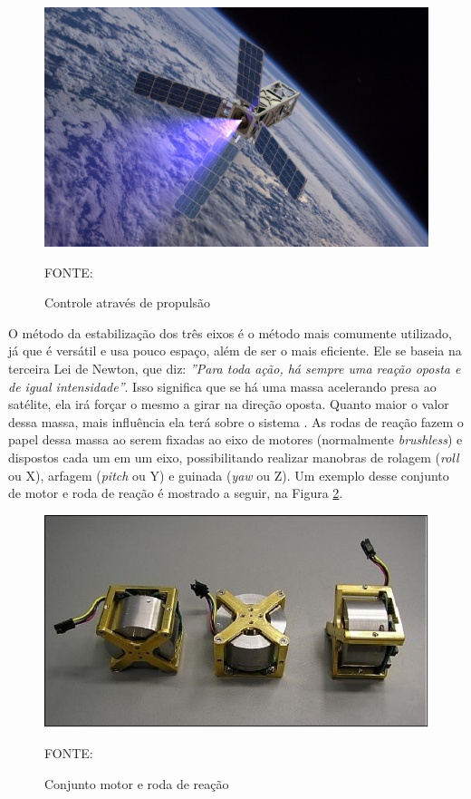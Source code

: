 \documentclass[
	12pt,				%
	openany,			%
	twoside,			%
	a4paper,			%
	english,			%
	french,				%
	spanish,			%
	brazil,				%
	oldfontcommands
	]{abntex2}
\begin{document}
\begin{figure}[th]
	\caption{Controle através de propulsão}
	\centering
	\includegraphics[width=0.8\linewidth]{./figs/Propulsion}
	
	\begin{small}
		FONTE: \cite{Prop}
	\end{small}
	\label{fig:Propulsion}
\end{figure}

\newpage

O método da estabilização dos três eixos é o método mais comumente utilizado, já que é versátil e usa pouco espaço, além de ser o mais eficiente. Ele se baseia na terceira Lei de Newton, que diz: \textit{''Para toda ação, há sempre uma reação oposta e de igual intensidade''}. Isso significa que se há uma massa acelerando presa ao satélite, ela irá forçar o mesmo a girar na direção oposta. Quanto maior o valor dessa massa, mais influência ela terá sobre o sistema \cite{Ericksson}. As rodas de reação fazem o papel dessa massa ao serem fixadas ao eixo de motores (normalmente \textit{brushless}) e dispostos cada um em um eixo, possibilitando realizar manobras de rolagem (\textit{roll} ou X), arfagem (\textit{pitch} ou Y) e guinada (\textit{yaw} ou Z). Um exemplo desse conjunto de motor e roda de reação é mostrado a seguir, na Figura \ref{fig:SRW}.

\begin{figure}[th]
	\caption{Conjunto motor e roda de reação}
	\centering
	\includegraphics[width=0.7\linewidth]{./figs/Shelf_Reaction_Wheel}
	
	\begin{small}
		FONTE: \cite{SWR}
	\end{small}
	\label{fig:SRW}
\end{figure}
\end{document}
